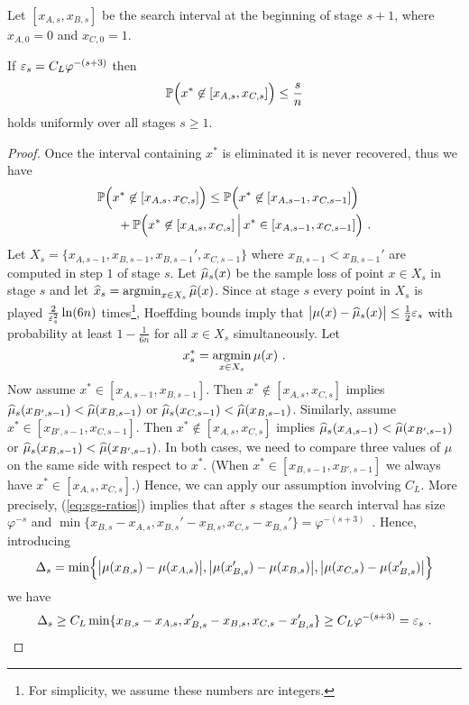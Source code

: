 Let $[x_{A,s},x_{B,s}]$ be the search interval at the beginning of stage $s+1$, where $x_{A,0} = 0$ and $x_{C,0} = 1$.
\begin{lemma}
If $\ve_s = C_L\varphi^{-(s+3)}$ then
\[
    \P\Bigl(x^* \not\in [x_{A,s},x_{C,s}]\Bigr) \le \frac{s}{n}
\]
holds uniformly over all stages $s \ge 1$.
\end{lemma}
%
\begin{proof}
Once the interval containing $x^*$ is eliminated it is never recovered, thus we have
\begin{align}
\nonumber
    \P&\Bigl(x^* \not\in [x_{A,s},x_{C,s}]\Bigr)
\le
    \P\Bigl(x^* \not\in [x_{A,s-1},x_{C,s-1}]\Bigr)
\\ &\quad
\label{eq:sgs-rec}
    + \P\Bigl(x^* \not\in [x_{A,s},x_{C,s}] \,\Big|\, x^* \in [x_{A,s-1},x_{C,s-1}]\Bigr)~.
\end{align}
Let $X_s = \{x_{A,s-1},x_{B,s-1},x_{B,s-1}',x_{C,s-1}\}$ where $x_{B,s-1} < x_{B,s-1}'$ are computed in step $1$ of stage $s$.
Let $\muhat_s(x)$ be the sample loss of point $x\in X_s$ in stage $s$ and let $\xhat_s = \argmin_{x\in X_s}\muhat(x)$. Since at stage $s$ every point in $X_s$ is played $\tfrac{2}{\ve_s^2}\ln(6n)$ times\footnote{For simplicity, we assume these numbers are integers.}, Hoeffding bounds imply that $\bigl|\mu(x)-\muhat_s(x)\bigr| \le \tfrac{1}{2}\ve_s$ with probability at least $1-\tfrac{1}{6n}$ for all $x\in X_s$ simultaneously. Let
\[
    x^*_s = \argmin_{x\in X_s}\mu(x)~.
\]
Now assume $x^* \in [x_{A,s-1},x_{B,s-1}]$. Then $x^* \not\in [x_{A,s},x_{C,s}]$ implies $\muhat_s(x_{B',s-1}) < \muhat(x_{B,s-1})$ or $\muhat_s(x_{C,s-1}) < \muhat(x_{B,s-1})$. Similarly, assume $x^* \in [x_{B',s-1},x_{C,s-1}]$. Then $x^* \not\in [x_{A,s},x_{C,s}]$ implies $\muhat_s(x_{A,s-1}) < \muhat(x_{B',s-1})$ or $\muhat_s(x_{B,s-1}) < \muhat(x_{B',s-1})$. In both cases, we need to compare three values of $\mu$ on the same side with respect to $x^*$. (When $x^* \in [x_{B,s-1},x_{B',s-1}]$ we always have $x^* \in [x_{A,s},x_{C,s}]$.) Hence, we can apply our assumption involving $C_L$. More precisely, (\ref{eq:sgs-ratios}) implies that after $s$ stages the search interval has size $\varphi^{-s}$ and $\min\{x_{B,s}-x_{A,s}, x_{B,s}'-x_{B,s}, x_{C,s} - x_{B,s}'\} = \varphi^{-(s+3)}$~. Hence, introducing
\[
    \Delta_s = \min\Bigl\{\big|\mu(x_{B,s})-\mu(x_{A,s})\big|, \big|\mu(x_{B,s}')-\mu(x_{B,s})\big|, \big|\mu(x_{C,s}) - \mu(x_{B,s}')\big|\Bigr\}
\]
we have
\[
    \Delta_s
\ge
    C_L\min\{x_{B,s}-x_{A,s}, x_{B,s}'-x_{B,s}, x_{C,s} - x_{B,s}'\} \ge C_L\varphi^{-(s+3)} = \ve_s~.
\]
\end{proof}
